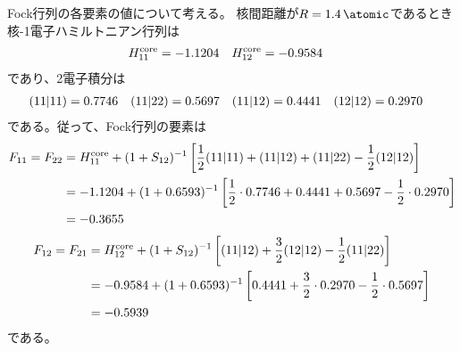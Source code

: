 Fock行列の各要素の値について考える。
核間距離が$R=\SI{1.4}{\atomic}$であるとき
核-1電子ハミルトニアン行列は
\begin{align}
	H^{\rm core}_{11}
&=
	-1.1204 &
%
	H^{\rm core}_{12}
&=
	-0.9584
\end{align}
であり、2電子積分は
\begin{align}
	\spacetwo{11}{11}
&=
	0.7746 &
%
	\spacetwo{11}{22}
&=
	0.5697 &
%
	\spacetwo{11}{12}
&=
	0.4441 &
%
	\spacetwo{12}{12}
&=
	0.2970
\end{align}
である。従って、Fock行列の要素は
\begin{align}
	F_{11}
=
	F_{22}
&=
	H^{\rm core}_{11}
	+
	(1+S_{12})^{-1}
	\left[
		\frac{1}{2}
		\spacetwo{11}{11}
		+
		\spacetwo{11}{12}
		+
		\spacetwo{11}{22}
		-
		\frac{1}{2}
		\spacetwo{12}{12}
	\right] \\
%
%
&=
	-
	1.1204
	+
	(1+0.6593)^{-1}
	\left[
		\frac{1}{2} \cdot
		0.7746
		+
		0.4441
		+
		0.5697
		-
		\frac{1}{2} \cdot
		0.2970
	\right] \\
%
%
&=
	-0.3655
\end{align}
\begin{align}
	F_{12}
=
	F_{21}
&=
	H^{\rm core}_{12}
	+
	(1+S_{12})^{-1}
	\left[
		\spacetwo{11}{12}
		+
		\frac{3}{2}
		\spacetwo{12}{12}
		-
		\frac{1}{2}
		\spacetwo{11}{22}
	\right] \\
%
%
&=
	-
	0.9584
	+
	(1+0.6593)^{-1}
	\left[
		0.4441
		+
		\frac{3}{2} \cdot
		0.2970
		-
		\frac{1}{2} \cdot
		0.5697
	\right] \\
%
%
&=
	-0.5939
\end{align}
である。


